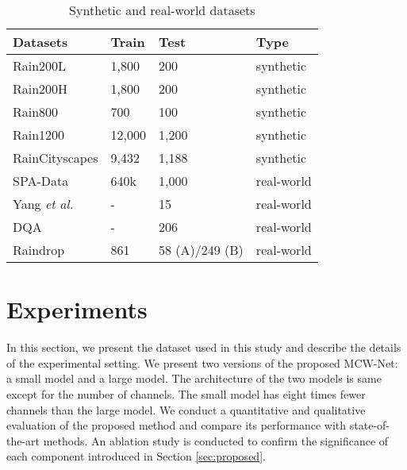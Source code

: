 \documentclass[a4paper,fleqn]{cas-dc}
\begin{document}
\begin{table}[h]
	\tabcolsep 0.05in{\scriptsize{}}
	\caption{Synthetic and real-world datasets}
	\vspace{0.15cm}
    \begin{tabular*}{\tblwidth}{@{}LLLL@{}}		\toprule
		Datasets                         & Train           & Test           & Type \\ \midrule
		Rain200L \cite{yang2017deep}      & 1,800                  & 200                   & synthetic\\
		Rain200H \cite{yang2017deep}      & 1,800                  & 200                   & synthetic\\
		Rain800 \cite{zhang2019image}     & 700                    & 100                   & synthetic\\
		Rain1200 \cite{zhang2018density}  & 12,000                 & 1,200                 & synthetic\\
		RainCityscapes \cite{Cordts2016Cityscapes,hu2019depth}  & 9,432         & 1,188                  & synthetic\\
	
		SPA-Data \cite{wang2019spatial}      & 640k                    & 1,000                 & real-world\\
		Yang \textit{et al.} \cite{yang2017deep}   & -                      & 15                    & real-world\\
		DQA \cite{wu2020subjective}    & -                      & 206                    & real-world \\ 

		 Raindrop \cite{qian2018attentive}   & 861                      & 58 (A)/249 (B)             & real-world \\  \bottomrule

	\end{tabular*}
	\smallskip
	\label{tab:dataset}
\end{table}


\section{Experiments}

In this section, we present the dataset used in this study and describe the details of the experimental setting. We present two versions of the proposed MCW-Net: a small model and a large model. The architecture of the two models is same except for the number of channels. The small model has eight times fewer channels than the large model.
We conduct a quantitative and qualitative evaluation of the proposed method and compare its performance with state-of-the-art methods. An ablation study is conducted to confirm the significance of each component introduced in Section \ref{sec:proposed}.
\end{document}
